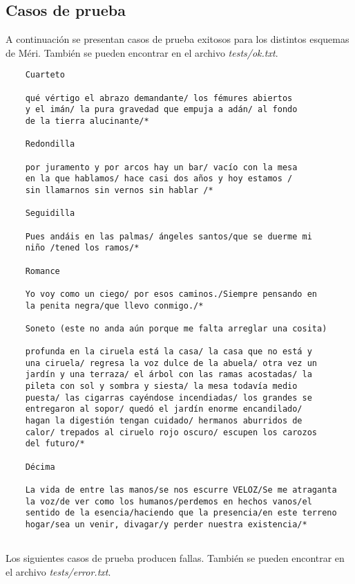 \documentclass[12pt, a4paper]{article}
\begin{document}
\subsection*{Casos de prueba}
A continuación se presentan casos de prueba exitosos para los distintos esquemas de Méri. También se pueden encontrar en el archivo \textit{tests/ok.txt}.
\begin{verbatim}
    Cuarteto
    
    qué vértigo el abrazo demandante/ los fémures abiertos 
    y el imán/ la pura gravedad que empuja a adán/ al fondo
    de la tierra alucinante/*

    Redondilla

    por juramento y por arcos hay un bar/ vacío con la mesa 
    en la que hablamos/ hace casi dos años y hoy estamos / 
    sin llamarnos sin vernos sin hablar /*    

    Seguidilla
    
    Pues andáis en las palmas/ ángeles santos/que se duerme mi
    niño /tened los ramos/*
    
    Romance
    
    Yo voy como un ciego/ por esos caminos./Siempre pensando en 
    la penita negra/que llevo conmigo./*

    Soneto (este no anda aún porque me falta arreglar una cosita)
    
    profunda en la ciruela está la casa/ la casa que no está y 
    una ciruela/ regresa la voz dulce de la abuela/ otra vez un 
    jardín y una terraza/ el árbol con las ramas acostadas/ la 
    pileta con sol y sombra y siesta/ la mesa todavía medio 
    puesta/ las cigarras cayéndose incendiadas/ los grandes se 
    entregaron al sopor/ quedó el jardín enorme encandilado/ 
    hagan la digestión tengan cuidado/ hermanos aburridos de 
    calor/ trepados al ciruelo rojo oscuro/ escupen los carozos 
    del futuro/*

    Décima
    
    La vida de entre las manos/se nos escurre VELOZ/Se me atraganta
    la voz/de ver como los humanos/perdemos en hechos vanos/el 
    sentido de la esencia/haciendo que la presencia/en este terreno
    hogar/sea un venir, divagar/y perder nuestra existencia/*
           
\end{verbatim}

Los siguientes casos de prueba producen fallas. También se pueden encontrar en el archivo \textit{tests/error.txt}.
\end{document}
